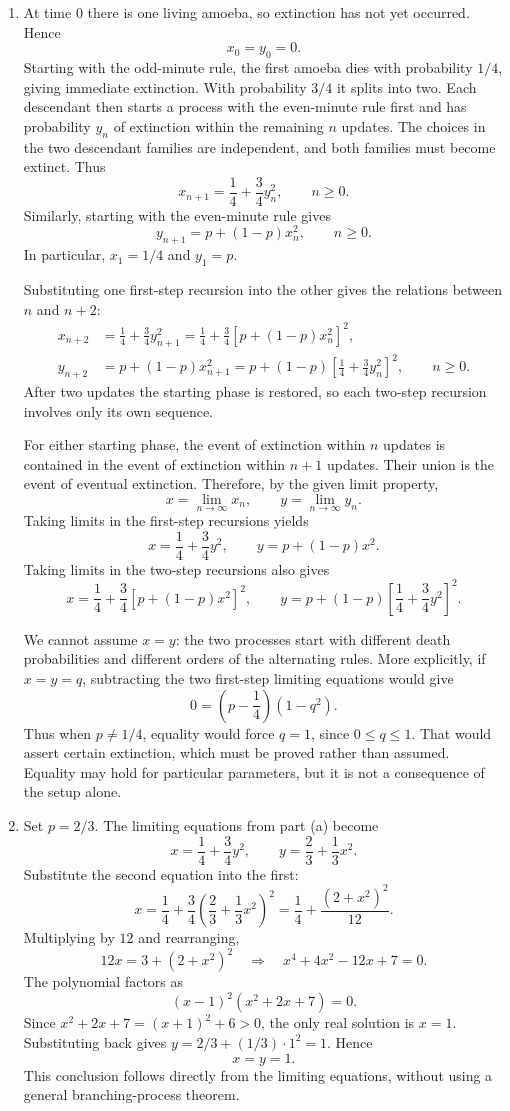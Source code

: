 \documentclass[11pt,a4paper]{article}
\begin{document}
\begin{enumerate}
\item At time $0$ there is one living amoeba, so extinction has not yet
occurred. Hence
\[
x_0=y_0=0.
\]
Starting with the odd-minute rule, the first amoeba dies with probability
$1/4$, giving immediate extinction. With probability $3/4$ it splits
into two. Each descendant then starts a process with the even-minute
rule first and has probability $y_n$ of extinction within the remaining
$n$ updates. The choices in the two descendant families are independent,
and both families must become extinct. Thus
\[
\boxed{x_{n+1}=\frac14+\frac34 y_n^2},\qquad n\ge0.
\]
Similarly, starting with the even-minute rule gives
\[
\boxed{y_{n+1}=p+(1-p)x_n^2},\qquad n\ge0.
\]
In particular, $x_1=1/4$ and $y_1=p$.

Substituting one first-step recursion into the other gives the relations
between $n$ and $n+2$:
\begin{align*}
x_{n+2}
&=\frac14+\frac34 y_{n+1}^2
=\boxed{\frac14+\frac34\left[p+(1-p)x_n^2\right]^2},\\
y_{n+2}
&=p+(1-p)x_{n+1}^2
=\boxed{p+(1-p)\left[\frac14+\frac34 y_n^2\right]^2},
\qquad n\ge0.
\end{align*}
After two updates the starting phase is restored, so each two-step
recursion involves only its own sequence.

For either starting phase, the event of extinction within $n$ updates
is contained in the event of extinction within $n+1$ updates. Their union
is the event of eventual extinction. Therefore, by the given limit
property,
\[
x=\lim_{n\to\infty}x_n,\qquad
y=\lim_{n\to\infty}y_n.
\]
Taking limits in the first-step recursions yields
\[
\boxed{x=\frac14+\frac34 y^2},\qquad
\boxed{y=p+(1-p)x^2}.
\]
Taking limits in the two-step recursions also gives
\[
x=\frac14+\frac34\left[p+(1-p)x^2\right]^2,
\qquad
y=p+(1-p)\left[\frac14+\frac34 y^2\right]^2.
\]

We cannot assume $x=y$: the two processes start with different death
probabilities and different orders of the alternating rules. More
explicitly, if $x=y=q$, subtracting the two first-step limiting equations
would give
\[
0=\left(p-\frac14\right)(1-q^2).
\]
Thus when $p\ne1/4$, equality would force $q=1$, since $0\le q\le1$.
That would assert certain extinction, which must be proved rather than
assumed. Equality may hold for particular parameters, but it is not a
consequence of the setup alone.

\item Set $p=2/3$. The limiting equations from part (a) become
\[
x=\frac14+\frac34 y^2,\qquad
y=\frac23+\frac13x^2.
\]
Substitute the second equation into the first:
\[
x=\frac14+\frac34\left(\frac23+\frac13x^2\right)^2
=\frac14+\frac{(2+x^2)^2}{12}.
\]
Multiplying by $12$ and rearranging,
\[
12x=3+(2+x^2)^2
\quad\Longrightarrow\quad
x^4+4x^2-12x+7=0.
\]
The polynomial factors as
\[
(x-1)^2(x^2+2x+7)=0.
\]
Since $x^2+2x+7=(x+1)^2+6>0$, the only real solution is $x=1$.
Substituting back gives $y=2/3+(1/3)\cdot1^2=1$. Hence
\[
\boxed{x=y=1}.
\]
This conclusion follows directly from the limiting equations, without
using a general branching-process theorem.


\end{enumerate}
\end{document}
